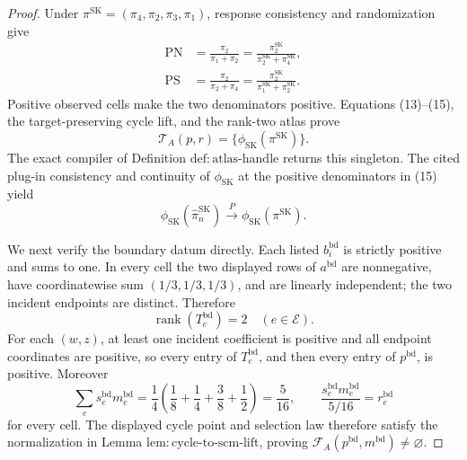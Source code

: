 \documentclass{article}
\begin{document}
\begin{proof}
Under \(\pi^{\mathrm{SK}}=(\pi_4,\pi_2,\pi_3,\pi_1)\), response consistency and randomization give
\[
 \begin{aligned}
 \mathrm{PN}
 &=\frac{\pi_2}{\pi_1+\pi_2}
  =\frac{\pi^{\mathrm{SK}}_2}
          {\pi^{\mathrm{SK}}_2+\pi^{\mathrm{SK}}_4},\\
 \mathrm{PS}
 &=\frac{\pi_2}{\pi_2+\pi_4}
  =\frac{\pi^{\mathrm{SK}}_2}
          {\pi^{\mathrm{SK}}_1+\pi^{\mathrm{SK}}_2}.
 \end{aligned}                                             \tag{15}
\]
Positive observed cells make the two denominators positive.  Equations (13)--(15), the target-preserving cycle lift, and the rank-two atlas prove
\[
 \mathcal T_A(p,r)
 =\{\phi_{\mathrm{SK}}(\pi^{\mathrm{SK}})\}.              \tag{16}
\]
The exact compiler of Definition \(\mathrm{def{:}atlas\text{-}handle}\) returns this singleton.  The cited plug-in consistency and continuity of \(\phi_{\mathrm{SK}}\) at the positive denominators in (15) yield
\[
 \phi_{\mathrm{SK}}(\widehat\pi_n^{\mathrm{SK}})
 \xrightarrow{P}\phi_{\mathrm{SK}}(\pi^{\mathrm{SK}}). \tag{17}
\]

We next verify the boundary datum directly.  Each listed \(b_i^{\mathrm{bd}}\) is strictly positive and sums to one.  In every cell the two displayed rows of \(a^{\mathrm{bd}}\) are nonnegative, have coordinatewise sum \((1/3,1/3,1/3)\), and are linearly independent; the two incident endpoints are distinct.  Therefore
\[
 \operatorname{rank}(T_e^{\mathrm{bd}})=2
 \quad(e\in\mathcal E).                                  \tag{18}
\]
For each \((w,z)\), at least one incident coefficient is positive and all endpoint coordinates are positive, so every entry of \(T_e^{\mathrm{bd}}\), and then every entry of \(p^{\mathrm{bd}}\), is positive.  Moreover
\[
 \sum_e s_e^{\mathrm{bd}}m_e^{\mathrm{bd}}
 =\frac14\left(\frac18+\frac14+\frac38+\frac12\right)
 =\frac5{16},
 \qquad
 \frac{s_e^{\mathrm{bd}}m_e^{\mathrm{bd}}}{5/16}
 =r_e^{\mathrm{bd}}                                      \tag{19}
\]
for every cell.  The displayed cycle point and selection law therefore satisfy the normalization in Lemma \(\mathrm{lem{:}cycle\text{-}to\text{-}scm\text{-}lift}\), proving
\(\mathcal F_A(p^{\mathrm{bd}},m^{\mathrm{bd}})\ne\varnothing\).


\end{proof}
\end{document}
